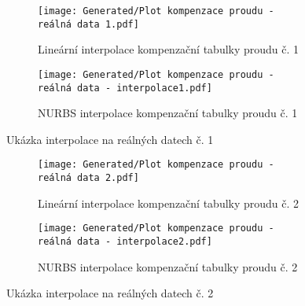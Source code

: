 \begin{landscapeimagepage}
    \begin{figure}[H]
        \centering
        \begin{subfigure}{.5\textheight}
            \centering
            \texttt{[image: Generated/Plot kompenzace proudu - reálná data 1.pdf]}
            \caption{Lineární interpolace kompenzační tabulky proudu č. 1}
            \label{fig:Lineární interpolace kompenzační tabulky proudu č. 1}
        \end{subfigure}
        \hspace{2.5cm}
        \begin{subfigure}{.5\textheight}
            \centering
            \texttt{[image: Generated/Plot kompenzace proudu - reálná data - interpolace1.pdf]}
            \caption{NURBS interpolace kompenzační tabulky proudu č. 1}
            \label{fig:NURBS interpolace kompenzační tabulky proudu č. 1}
        \end{subfigure}
        \caption{Ukázka interpolace na reálných datech č. 1}
        \label{fig: Ukázka interpolace na reálných datech č. 1}
    \end{figure}
    \begin{figure}[H]
        \centering
        \begin{subfigure}{.5\textheight}
            \centering
            \texttt{[image: Generated/Plot kompenzace proudu - reálná data 2.pdf]}
            \caption{Lineární interpolace kompenzační tabulky proudu č. 2}
            \label{fig:Lineární interpolace kompenzační tabulky proudu č. 2}
        \end{subfigure}
        \hspace{2.5cm}
        \begin{subfigure}{.5\textheight}
            \centering
            \texttt{[image: Generated/Plot kompenzace proudu - reálná data - interpolace2.pdf]}
            \caption{NURBS interpolace kompenzační tabulky proudu č. 2}
            \label{fig:NURBS interpolace kompenzační tabulky proudu č. 2}
        \end{subfigure}
        \caption{Ukázka interpolace na reálných datech č. 2}
        \label{fig: Ukázka interpolace na reálných datech č. 2}
    \end{figure}
\end{landscapeimagepage}

